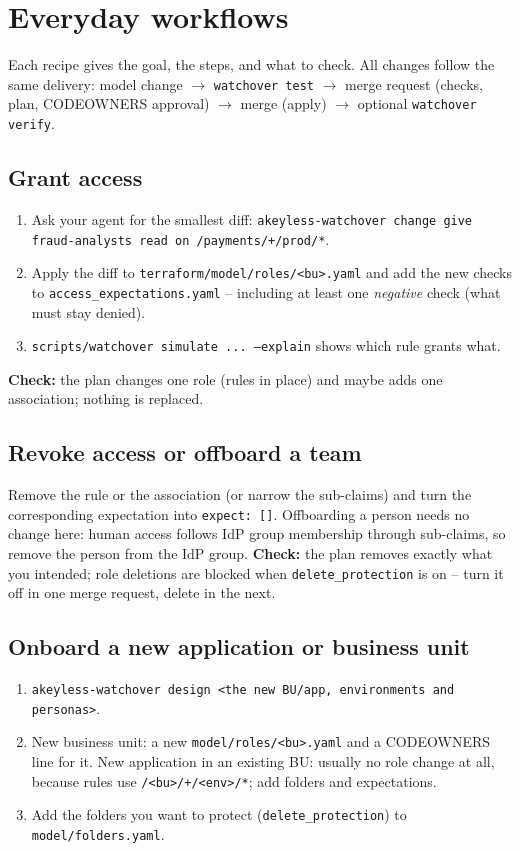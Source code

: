 \chapter{Everyday workflows}\label{ch:workflows}

Each recipe gives the goal, the steps, and what to check. All changes follow the same delivery:
model change $\rightarrow$ \texttt{watchover test} $\rightarrow$ merge request (checks, plan,
CODEOWNERS approval) $\rightarrow$ merge (apply) $\rightarrow$ optional \texttt{watchover verify}.

\section{Grant access}
\begin{enumerate}
\item Ask your agent for the smallest diff:
  \texttt{akeyless-watchover change give fraud-analysts read on /payments/+/prod/*}.
\item Apply the diff to \texttt{terraform/model/roles/<bu>.yaml} and add the new checks to
  \texttt{access\_expectations.yaml} -- including at least one \emph{negative} check (what must stay denied).
\item \texttt{scripts/watchover simulate ... --explain} shows which rule grants what.
\end{enumerate}
\textbf{Check:} the plan changes one role (rules in place) and maybe adds one association; nothing is replaced.

\section{Revoke access or offboard a team}
Remove the rule or the association (or narrow the sub-claims) and turn the corresponding
expectation into \texttt{expect: []}. Offboarding a person needs no change here: human access
follows IdP group membership through sub-claims, so remove the person from the IdP group.
\textbf{Check:} the plan removes exactly what you intended; role deletions are blocked when
\texttt{delete\_protection} is on -- turn it off in one merge request, delete in the next.

\section{Onboard a new application or business unit}
\begin{enumerate}
\item \texttt{akeyless-watchover design <the new BU/app, environments and personas>}.
\item New business unit: a new \texttt{model/roles/<bu>.yaml} and a CODEOWNERS line for it.
  New application in an existing BU: usually no role change at all, because rules use
  \texttt{/<bu>/+/<env>/*}; add folders and expectations.
\item Add the folders you want to protect (\texttt{delete\_protection}) to \texttt{model/folders.yaml}.
\end{enumerate}

